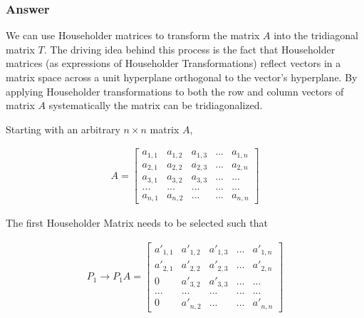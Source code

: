\documentclass{article}
\newcommand{\n}{\newline}
\begin{document}
		\subsubsection{Answer}	
		
		We can use Householder matrices to transform the matrix $A$ into the tridiagonal matrix $T$.  The driving idea behind this process is the fact that Householder matrices (as expressions of Householder Transformations) reflect vectors in a matrix space across a unit hyperplane orthogonal to the vector's hyperplane.  By applying Householder transformations to both the row and column vectors of matrix $A$ systematically the matrix can be tridiagonalized.  \n
		
		Starting with an arbitrary $n\times n$ matrix $A$,
		
		\begin{align*}
			A=
			\begin{bmatrix}
			a_{1,1} & a_{1,2} & a_{1,3} & ... & a_{1,n}\\
			a_{2,1} & a_{2,2} & a_{2,3} & ... & a_{2,n} \\
			a_{3,1} & a_{3,2} & a_{3,3} & ... & ... \\
			... & ... & ... & ... & ...\\
			a_{n,1} & a_{n,2} & ... & ... & a_{n,n}
			\end{bmatrix}
		\end{align*}
		
		The first Householder Matrix needs to be selected such that 
		
		\begin{align*}
			P_{1}\rightarrow P_{1}A=
			\begin{bmatrix}
			a'_{1,1} & a'_{1,2} & a'_{1,3} & ... & a'_{1,n}\\
			a'_{2,1} & a'_{2,2} & a'_{2,3} & ... & a'_{2,n} \\
			0 & a'_{3,2} & a'_{3,3} & ... & ... \\
			... & ... & ... & ... & ...\\
			0 & a'_{n,2} & ... & ... & a'_{n,n}
			\end{bmatrix}
		\end{align*}
		
		
\end{document}

